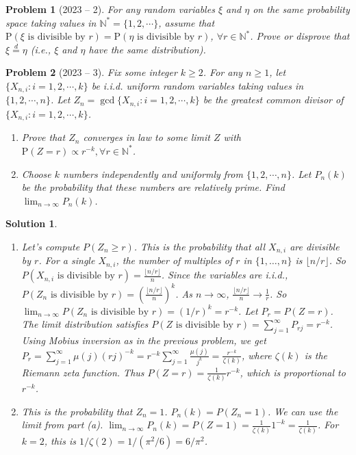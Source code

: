 \documentclass[12pt]{amsart}
\newtheorem{problem}{Problem}
\newtheorem*{solution}{Solution}
\begin{document}
\begin{problem}[2023 -- 2]
For any random variables $\xi$ and $\eta$ on the same probability space taking values in $\mathbb{N}^*=\{1,2, \cdots\}$, assume that $\mathrm{P}(\xi \text{ is divisible by } r)=\mathrm{P}(\eta \text{ is divisible by } r)$, $\forall r \in \mathbb{N}^*$. Prove or disprove that $\xi \stackrel{d}{=} \eta$ (i.e., $\xi$ and $\eta$ have the same distribution).
\end{problem}

\begin{problem}[2023 -- 3]
Fix some integer $k \geq 2$. For any $n \geq 1$, let $\{X_{n, i}: i=1,2, \cdots, k\}$ be i.i.d. uniform random variables taking values in $\{1,2, \cdots, n\}$. Let $Z_n=\operatorname{gcd}\{X_{n, i} : i=1,2, \cdots, k\}$ be the greatest common divisor of $\{X_{n, i}: i=1,2, \cdots, k\}$.
\begin{enumerate}[label=(\alph*)]
\item Prove that $Z_n$ converges in law to some limit $Z$ with $\mathrm{P}(Z=r) \propto r^{-k}, \forall r \in \mathbb{N}^*$.
\item Choose $k$ numbers independently and uniformly from $\{1,2, \cdots, n\}$. Let $P_n(k)$ be the probability that these numbers are relatively prime. Find $\lim _{n \rightarrow \infty} P_n(k)$.
\end{enumerate}
\end{problem}
\begin{solution}
\begin{enumerate}[label=(\alph*)]
\item Let's compute $P(Z_n \ge r)$. This is the probability that all $X_{n,i}$ are divisible by $r$.
For a single $X_{n,i}$, the number of multiples of $r$ in $\{1, \ldots, n\}$ is $\lfloor n/r \rfloor$.
So $P(X_{n,i} \text{ is divisible by } r) = \frac{\lfloor n/r \rfloor}{n}$.
Since the variables are i.i.d., $P(Z_n \text{ is divisible by } r) = \left(\frac{\lfloor n/r \rfloor}{n}\right)^k$.
As $n \to \infty$, $\frac{\lfloor n/r \rfloor}{n} \to \frac{1}{r}$.
So $\lim_{n\to\infty} P(Z_n \text{ is divisible by } r) = (1/r)^k = r^{-k}$.
Let $P_r = P(Z=r)$. The limit distribution satisfies $P(Z \text{ is divisible by } r) = \sum_{j=1}^\infty P_{rj} = r^{-k}$.
Using Mobius inversion as in the previous problem, we get $P_r = \sum_{j=1}^\infty \mu(j) (rj)^{-k} = r^{-k} \sum_{j=1}^\infty \frac{\mu(j)}{j^k} = \frac{r^{-k}}{\zeta(k)}$, where $\zeta(k)$ is the Riemann zeta function.
Thus $P(Z=r) = \frac{1}{\zeta(k)}r^{-k}$, which is proportional to $r^{-k}$.
\item This is the probability that $Z_n=1$.
$P_n(k) = P(Z_n=1)$. We can use the limit from part (a).
$\lim_{n\to\infty} P_n(k) = P(Z=1) = \frac{1}{\zeta(k)}1^{-k} = \frac{1}{\zeta(k)}$.
For $k=2$, this is $1/\zeta(2) = 1/(\pi^2/6) = 6/\pi^2$.
\end{enumerate}
\end{solution}
\end{document}
